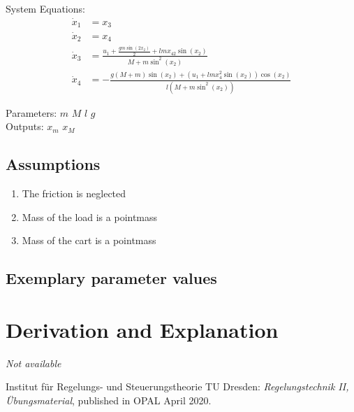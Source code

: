 \documentclass[10pt,a4paper]{article}
\begin{document}
	\noindent System Equations:			
	\begin{subequations}
	\begin{align}
		\dot{x}_1 &= x_3 \\
		\dot{x}_2 &= x_4 \\
		\dot{x}_3 &= \frac{u_1 + \frac{gm\sin(2x_2)}{2} + lmx_42\sin(x_2)}{M + m\sin^2(x_2)} \\
		\dot{x}_4 &= - \frac{g(M + m)\sin(x_2) + (u_1 + lmx_4^2\sin(x_2))\cos(x_2)}{l(M + m\sin^2(x_2))}
	\end{align}
	\end{subequations}

	\noindent
	Parameters: $m$ $M$ $l$ $g$ %
	\\
	Outputs: $x_m$ $x_M$ %
	
	
	\subsection{Assumptions} %
		\begin{enumerate} %
			\item The friction is neglected
			\item Mass of the load is a pointmass
			\item Mass of the cart is a pointmass 
		\end{enumerate}
	
	
	\subsection{Exemplary parameter values}
	

	
	\section{Derivation and Explanation} %
	
	\textit{Not available}
	
	
	\begin{thebibliography}{10}	
		Institut für Regelungs- und Steuerungstheorie TU Dresden: 
		\textit{Regelungstechnik II, Übungsmaterial}, published in OPAL April 2020.	
	\end{thebibliography}
\end{document}
